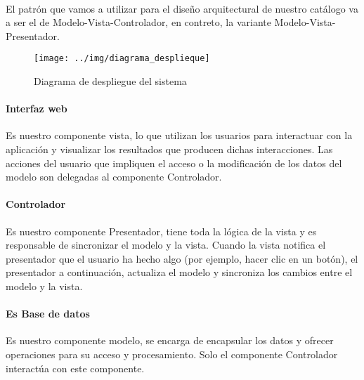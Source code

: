 \paragraph{}El patrón que vamos a utilizar para el diseño arquitectural de nuestro 
catálogo va a ser el de Modelo-Vista-Controlador, en contreto, la variante Modelo-Vista-Presentador.

\vspace{.2cm}
\begin{figure}[h!]
 \centering
 \texttt{[image: ../img/diagrama\_desplieque]}
 \caption{Diagrama de despliegue del sistema}
\end{figure}
\vspace{.2cm}


\paragraph{Interfaz web}Es nuestro componente vista, lo que utilizan los usuarios para 
interactuar con la aplicación y visualizar los resultados que producen dichas
interacciones. Las acciones del usuario que impliquen el acceso o la modificación
de los datos del modelo son delegadas al componente Controlador.

\paragraph{Controlador}Es nuestro componente Presentador, tiene toda la lógica de la vista 
y es responsable de sincronizar el modelo y la vista. Cuando la vista notifica el 
presentador que el usuario ha hecho algo (por ejemplo, hacer clic en un botón), 
el presentador a continuación, actualiza el modelo y sincroniza los cambios 
entre el modelo y la vista.

\paragraph{Es Base de datos}Es nuestro componente modelo, se encarga de encapsular 
los datos y ofrecer operaciones para su acceso y procesamiento. Solo el componente
Controlador interactúa con este componente.
